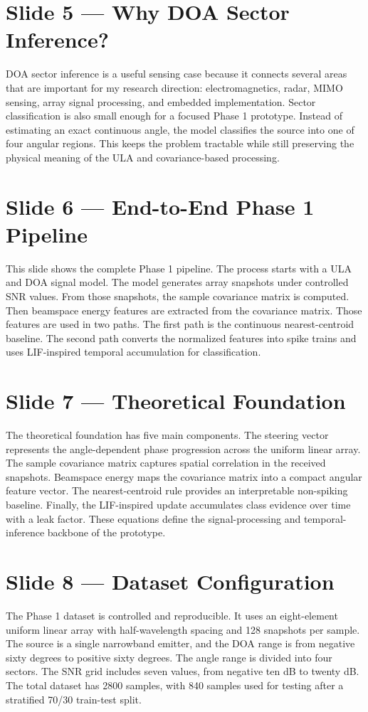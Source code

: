 \documentclass[11pt]{article}
\begin{document}
\section*{Slide 5 — Why DOA Sector Inference?}
DOA sector inference is a useful sensing case because it connects several areas that are important for my research direction: electromagnetics, radar, MIMO sensing, array signal processing, and embedded implementation. Sector classification is also small enough for a focused Phase 1 prototype. Instead of estimating an exact continuous angle, the model classifies the source into one of four angular regions. This keeps the problem tractable while still preserving the physical meaning of the ULA and covariance-based processing.

\section*{Slide 6 — End-to-End Phase 1 Pipeline}
This slide shows the complete Phase 1 pipeline. The process starts with a ULA and DOA signal model. The model generates array snapshots under controlled SNR values. From those snapshots, the sample covariance matrix is computed. Then beamspace energy features are extracted from the covariance matrix. Those features are used in two paths. The first path is the continuous nearest-centroid baseline. The second path converts the normalized features into spike trains and uses LIF-inspired temporal accumulation for classification.

\section*{Slide 7 — Theoretical Foundation}
The theoretical foundation has five main components. The steering vector represents the angle-dependent phase progression across the uniform linear array. The sample covariance matrix captures spatial correlation in the received snapshots. Beamspace energy maps the covariance matrix into a compact angular feature vector. The nearest-centroid rule provides an interpretable non-spiking baseline. Finally, the LIF-inspired update accumulates class evidence over time with a leak factor. These equations define the signal-processing and temporal-inference backbone of the prototype.

\section*{Slide 8 — Dataset Configuration}
The Phase 1 dataset is controlled and reproducible. It uses an eight-element uniform linear array with half-wavelength spacing and 128 snapshots per sample. The source is a single narrowband emitter, and the DOA range is from negative sixty degrees to positive sixty degrees. The angle range is divided into four sectors. The SNR grid includes seven values, from negative ten dB to twenty dB. The total dataset has 2800 samples, with 840 samples used for testing after a stratified 70/30 train-test split.
\end{document}
